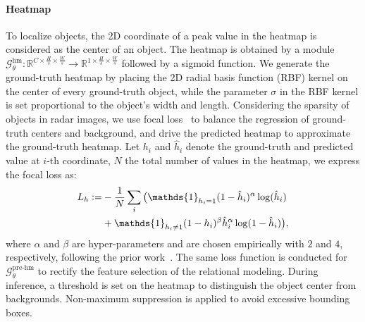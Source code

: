\documentclass[10pt,twocolumn,letterpaper]{article}
\newcommand{\RR}{\mathbb{R}}
\newcommand{\defeq}{\vcentcolon=}
\begin{document}
\paragraph{Heatmap} To localize objects, the 2D coordinate of a peak value in the heatmap is considered as the center of an object. The heatmap is obtained by a module $\mathcal{G}_\theta^{\text{hm}}: \RR^{C\times \frac{H}{s}\times \frac{W}{s}} \rightarrow \RR^{1\times \frac{H}{s}\times \frac{W}{s}}$ followed by a sigmoid function. We generate the ground-truth heatmap by placing the 2D radial basis function (RBF) kernel on the center of every ground-truth object, while the parameter $\sigma$ in the RBF kernel is set proportional to the object's width and length. Considering the sparsity of objects in radar images, we use focal loss~\cite{lin2017focal} to balance the regression of ground-truth centers and background, and drive the predicted heatmap to approximate the ground-truth heatmap. Let $h_i$ and $\hat{h}_i$ denote the ground-truth and predicted value at $i$-th coordinate, $N$ the total number of values in the heatmap, we express the focal loss as:
\begin{equation}
\begin{split}
    L_h \defeq& -\frac{1}{N}\sum_i \big(\mathds{1}_{h_i = 1}(1 - \hat{h}_i)^\alpha\log(\hat{h}_i) \\
    &+ \mathds{1}_{h_i \neq 1}(1 - h_i)^\beta \hat{h}_i^\alpha \log(1 - \hat{h}_i) \big),
\end{split}
\end{equation}
where $\alpha$ and $\beta$ are hyper-parameters and are chosen empirically with $2$ and $4$, respectively, following the prior work~\cite{yi2021oriented}. The same loss function is conducted for $\mathcal{G}_\theta^{\text{pre-hm}}$ to rectify the feature selection of the relational modeling. During inference, a threshold is set on the heatmap to distinguish the object center from backgrounds. Non-maximum suppression is applied to avoid excessive bounding boxes.

\vspace{-4mm}
\end{document}

